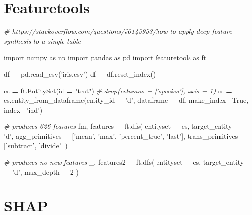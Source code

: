 \documentclass[]{book}
\newenvironment{Shaded}{\begin{snugshade}}{\end{snugshade}}
\newcommand{\BuiltInTok}[1]{#1}
\newcommand{\CommentTok}[1]{\textcolor[rgb]{0.56,0.35,0.01}{\textit{#1}}}
\newcommand{\DecValTok}[1]{\textcolor[rgb]{0.00,0.00,0.81}{#1}}
\newcommand{\ImportTok}[1]{#1}
\newcommand{\NormalTok}[1]{#1}
\newcommand{\OperatorTok}[1]{\textcolor[rgb]{0.81,0.36,0.00}{\textbf{#1}}}
\newcommand{\StringTok}[1]{\textcolor[rgb]{0.31,0.60,0.02}{#1}}
\newcommand{\VariableTok}[1]{\textcolor[rgb]{0.00,0.00,0.00}{#1}}
\begin{document}
\hypertarget{featuretools}{%
\section{Featuretools}\label{featuretools}}

\begin{Shaded}
\begin{Highlighting}[]
\CommentTok{# https://stackoverflow.com/questions/50145953/how-to-apply-deep-feature-synthesis-to-a-single-table}

\ImportTok{import}\NormalTok{ numpy }\ImportTok{as}\NormalTok{ np}
\ImportTok{import}\NormalTok{ pandas }\ImportTok{as}\NormalTok{ pd}
\ImportTok{import}\NormalTok{ featuretools }\ImportTok{as}\NormalTok{ ft}

\NormalTok{df }\OperatorTok{=}\NormalTok{ pd.read_csv(}\StringTok{'iris.csv'}\NormalTok{)}
\NormalTok{df }\OperatorTok{=}\NormalTok{ df.reset_index()}

\NormalTok{es }\OperatorTok{=}\NormalTok{ ft.EntitySet(}\BuiltInTok{id} \OperatorTok{=} \StringTok{"test"}\NormalTok{) }\CommentTok{#.drop(columns = ['species'], axis = 1)}
\NormalTok{es }\OperatorTok{=}\NormalTok{ es.entity_from_dataframe(entity_id }\OperatorTok{=} \StringTok{'d'}\NormalTok{, dataframe }\OperatorTok{=}\NormalTok{ df, make_index}\OperatorTok{=}\VariableTok{True}\NormalTok{, index}\OperatorTok{=}\StringTok{'ind'}\NormalTok{)}

\CommentTok{# produces 626 features}
\NormalTok{fm, features }\OperatorTok{=}\NormalTok{ ft.dfs(}
\NormalTok{    entityset }\OperatorTok{=}\NormalTok{ es, }
\NormalTok{    target_entity }\OperatorTok{=} \StringTok{'d'}\NormalTok{,}
\NormalTok{    agg_primitives }\OperatorTok{=}\NormalTok{ [}\StringTok{'mean'}\NormalTok{, }\StringTok{'max'}\NormalTok{, }\StringTok{'percent_true'}\NormalTok{, }\StringTok{'last'}\NormalTok{],}
\NormalTok{    trans_primitives }\OperatorTok{=}\NormalTok{ [}\StringTok{'subtract'}\NormalTok{, }\StringTok{'divide'}\NormalTok{]}
\NormalTok{)}

\CommentTok{# produces no new features}
\NormalTok{_, features2 }\OperatorTok{=}\NormalTok{ ft.dfs(}
\NormalTok{    entityset }\OperatorTok{=}\NormalTok{ es, }
\NormalTok{    target_entity }\OperatorTok{=} \StringTok{'d'}\NormalTok{,}
\NormalTok{    max_depth }\OperatorTok{=} \DecValTok{2}
\NormalTok{)}
\end{Highlighting}
\end{Shaded}

\hypertarget{shap}{%
\section{SHAP}\label{shap}}
\end{document}
